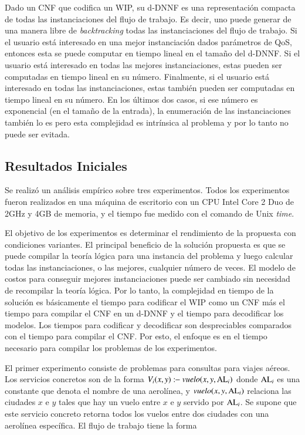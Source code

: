 Dado un CNF que codifica un WIP, su d-DNNF es una representación compacta de
todas las instanciaciones del flujo de trabajo. Es decir, uno puede generar de
una manera libre de \emph{backtracking} todas las instanciaciones del flujo de
trabajo. Si el usuario está interesado en una mejor instanciación dados
parámetros de QoS, entonces esta se puede computar en tiempo lineal en el tamaño
del d-DNNF. Si el usuario está interesado en todas las mejores instanciaciones,
estas pueden ser computadas en tiempo lineal en su número. Finalmente, si el
usuario está interesado en todas las instanciaciones, estas también pueden ser
computadas en tiempo lineal en su número. En los últimos dos casos, si ese
número es exponencial (en el tamaño de la entrada), la enumeración de las
instanciaciones también lo es pero esta complejidad es intrínsica al problema y
por lo tanto no puede ser evitada.

\subsection{Resultados Iniciales}

Se realizó un análisis empírico sobre tres experimentos. Todos los experimentos
fueron realizados en una máquina de escritorio con un CPU Intel Core 2 Duo de
2GHz y 4GB de memoria, y el tiempo fue medido con el comando de Unix
\emph{time}.

El objetivo de los experimentos es determinar el rendimiento de la propuesta con
condiciones variantes. El principal beneficio de la solución propuesta es
que se puede compilar la teoría lógica para una instancia del problema y luego
calcular todas las instanciaciones, o las mejores, cualquier número de veces. El
modelo de costos para conseguir mejores instanciaciones puede ser cambiado sin
necesidad de recompilar la teoría lógica. Por lo tanto, la complejidad en tiempo
de la solución es básicamente el tiempo para codificar el WIP como un
CNF más el tiempo para compilar el CNF en un d-DNNF y el tiempo para decodificar
los modelos. Los tiempos para codificar y decodificar son despreciables
comparados con el tiempo para compilar el CNF. Por esto, el enfoque es en el tiempo
necesario para compilar los problemas de los experimentos.

El primer experimento consiste de problemas para consultas para viajes aéreos.
Los servicios concretos son de la forma $V_i(x,y):\!\!-\ \text{\it vuelo}(x,y,\text{AL}_i)$
donde $\text{AL}_i$ es una
constante que denota el nombre de una aerolínea, y $\text{\it vuelo}(x,y,\text{AL}_i)$ relaciona las
ciudades $x$ e $y$ tales que hay un vuelo entre $x$ e $y$ servido por $\text{AL}_i$.
Se supone que este servicio concreto retorna todos los vuelos entre dos ciudades
con una aerolínea específica. El flujo de trabajo tiene la forma

